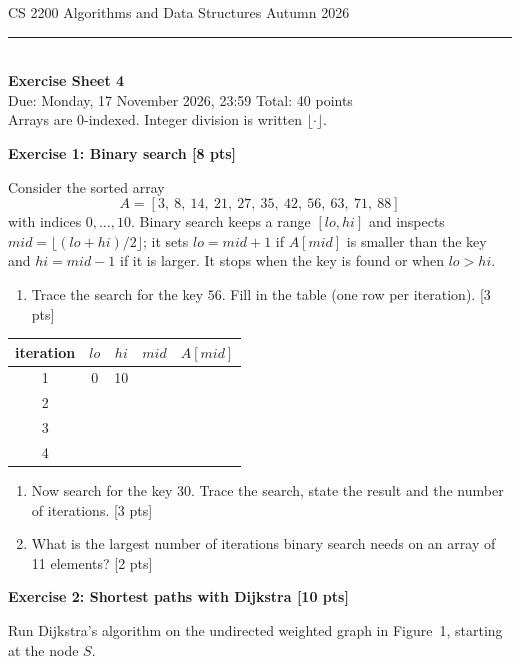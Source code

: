 \documentclass[11pt,a4paper]{article}
\newcommand{\exercise}[3]{\bigskip\par\noindent\textbf{Exercise #1: #2 [#3 pts]}\par\nopagebreak\smallskip}
\newcommand{\blank}{\rule{0pt}{1.1em}\hspace{1.4em}}
\begin{document}
{\small CS 2200 \textperiodcentered{} Algorithms and Data Structures \hfill Autumn 2026}\\[-0.4em]
\rule{\linewidth}{0.6pt}\\[0.5em]
{\Large\bfseries Exercise Sheet 4}\\[0.4em]
Due: Monday, 17 November 2026, 23:59 \hfill Total: 40 points\\[0.3em]
{\small Arrays are 0-indexed. Integer division is written $\lfloor\cdot\rfloor$.}

\exercise{1}{Binary search}{8}
Consider the sorted array
\[
A = [3,\ 8,\ 14,\ 21,\ 27,\ 35,\ 42,\ 56,\ 63,\ 71,\ 88]
\]
with indices $0,\dots,10$. Binary search keeps a range $[\mathit{lo}, \mathit{hi}]$ and inspects
$\mathit{mid} = \lfloor(\mathit{lo}+\mathit{hi})/2\rfloor$; it sets $\mathit{lo} = \mathit{mid}+1$ if
$A[\mathit{mid}]$ is smaller than the key and $\mathit{hi} = \mathit{mid}-1$ if it is larger. It stops when
the key is found or when $\mathit{lo} > \mathit{hi}$.
\begin{enumerate}
  \item Trace the search for the key $56$. Fill in the table (one row per iteration). [3 pts]
\end{enumerate}
\begin{center}
\begin{tabular}{c|c|c|c|c}
\toprule
iteration & $\mathit{lo}$ & $\mathit{hi}$ & $\mathit{mid}$ & $A[\mathit{mid}]$ \\
\midrule
1 & 0 & 10 & \blank & \blank \\
2 & \blank & \blank & \blank & \blank \\
3 & \blank & \blank & \blank & \blank \\
4 & \blank & \blank & \blank & \blank \\
\bottomrule
\end{tabular}
\end{center}
\begin{enumerate}[resume]
  \item Now search for the key $30$. Trace the search, state the result and the number of iterations. [3 pts]
  \item What is the largest number of iterations binary search needs on an array of 11 elements? [2 pts]
\end{enumerate}

\exercise{2}{Shortest paths with Dijkstra}{10}
Run Dijkstra's algorithm on the undirected weighted graph in Figure~1, starting at the node $S$.
\end{document}

